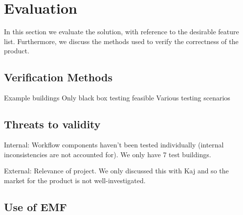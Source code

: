 \section{Evaluation}
In this section we evaluate the solution, with reference to the desirable feature list. Furthermore, we discuss the methods used to verify the correctness of the product.




\subsection{Verification Methods}


Example buildings
Only black box testing feasible
Various testing scenarios


\subsection{Threats to validity}
Internal:
Workflow components haven't been tested individually (internal inconsistencies are not accounted for). We only have 7 test buildings.

External:
Relevance of project. We only discussed this with Kaj and so the market for the product is not well-investigated.



\subsection{Use of EMF}
\label{subsec:use_of_EMF}
